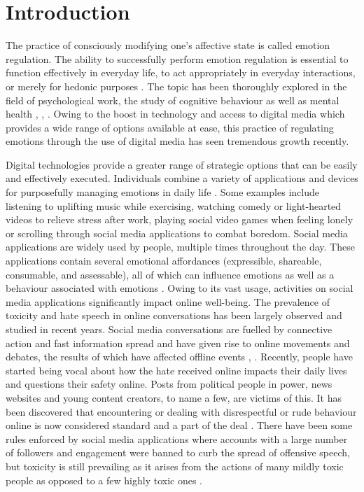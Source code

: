 \documentclass[acmtog]{acmart}
\begin{document}
\maketitle

\section{Introduction}
The practice of consciously modifying one's affective state is called emotion regulation. The ability to successfully perform emotion regulation is essential to function effectively in everyday life, to act appropriately in everyday interactions, or merely for hedonic purposes \cite{wadley2020digital}. The topic has been thoroughly explored in the field of psychological work, the study of cognitive behaviour as well as mental health \cite{mcrae2020emotion}, \cite{gross2015emotion}, \cite{gross2014emotion}. Owing to the boost in technology and access to digital media which provides a wide range of options available at ease, this practice of regulating emotions through the use of digital media has seen tremendous growth recently. 


Digital technologies provide a greater range of strategic options that can be easily and effectively executed. Individuals combine a variety of applications and devices for purposefully managing emotions in daily life \cite{smith2022digital}. Some examples include listening to uplifting music while exercising, watching comedy or light-hearted videos to relieve stress after work, playing social video games when feeling lonely or scrolling through social media applications to combat boredom. Social media applications are widely used by people, multiple times throughout the day. These applications contain several emotional affordances (expressible, shareable, consumable, and assessable), all of which can influence emotions as well as a behaviour associated with emotions \cite{steinert2022emotions}. Owing to its vast usage, activities on social media applications significantly impact online well-being. The prevalence of toxicity and hate speech in online conversations has been largely observed and studied in recent years. Social media conversations are fuelled by connective action and fast information spread and have given rise to online movements and debates, the results of which have affected offline events \cite{saveski2021structure}, \cite{mirbabaie2021development}. Recently, people have started being vocal about how the hate received online impacts their daily lives and questions their safety online. Posts from political people in power, news websites and young content creators, to name a few, are victims of this. It has been discovered that encountering or dealing with disrespectful or rude behaviour online is now considered standard and a part of the deal \cite{thomas2022s}. There have been some rules enforced by social media applications where accounts with a large number of followers and engagement were banned to curb the spread of offensive speech, but toxicity is still prevailing as it arises from the actions of many mildly toxic people as opposed to a few highly toxic ones \cite{saveski2021structure}. 
\end{document}
